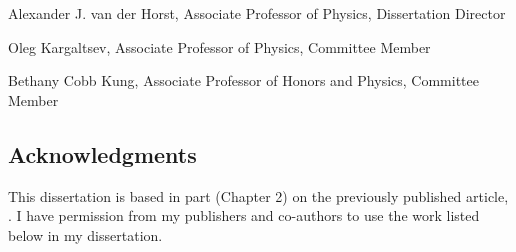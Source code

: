 \documentclass[12pt]{article}
\begin{document}
\indent Alexander J. van der Horst, Associate Professor of Physics, Dissertation Director
\vspace{12pt}


\indent Oleg Kargaltsev, Associate Professor of Physics, Committee Member
\vspace{12pt}

\indent Bethany Cobb Kung, Associate Professor of Honors and Physics, Committee 
\indent Member
\vspace{24pt}








\doublespacing
\newpage
{} \label{acknowledgements}
\begin{center}
\section*{Acknowledgments}
\end{center}
\vspace*{6pt}
\doublespacing
This dissertation is based in part (Chapter 2) on the previously published article, \citet{2022A&C....4000629C}. I have permission from my publishers and co-authors to use the work listed below in my dissertation. 
\end{document}
